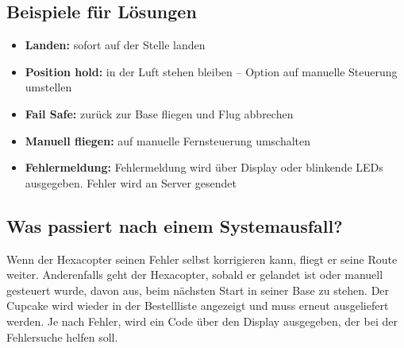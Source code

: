 \subsection*{Beispiele für Lösungen}
\begin{itemize}
\item \textbf{Landen:} sofort auf der Stelle landen
\item \textbf{Position hold:} in der Luft stehen bleiben – Option auf manuelle Steuerung umstellen
\item \textbf{Fail Safe:} zurück zur Base fliegen und Flug abbrechen
\item \textbf{Manuell fliegen:} auf manuelle Fernsteuerung umschalten
\item \textbf{Fehlermeldung:} Fehlermeldung wird über Display oder blinkende LEDs ausgegeben. Fehler wird an Server gesendet
\end{itemize}

\subsection*{Was passiert nach einem Systemausfall?}
Wenn der Hexacopter seinen Fehler selbst korrigieren kann, fliegt er seine Route weiter.
Anderenfalls geht der Hexacopter, sobald er gelandet ist oder manuell gesteuert wurde, davon aus, beim nächsten Start in seiner Base zu stehen. Der Cupcake wird wieder in der Bestellliste angezeigt und muss erneut ausgeliefert werden. Je nach Fehler, wird ein Code über den Display ausgegeben, der bei der Fehlersuche helfen soll.
